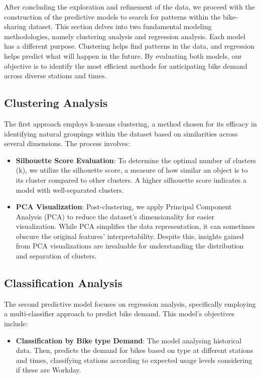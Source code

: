 After concluding the exploration and refinement of the data, we proceed with the construction of the predictive models to search for patterns within the bike-sharing dataset.
This section delves into two fundamental modeling methodologies, namely clustering analysis and regression analysis.
Each model has a different purpose.
Clustering helps find patterns in the data, and regression helps predict what will happen in the future.
By evaluating both models, our objective is to identify the most efficient methods for anticipating bike demand across diverse stations and times.

\subsection{Clustering Analysis}\label{subsec:clustering-analysis}


The first approach employs k-means clustering, a method chosen for its efficacy in identifying natural groupings within the dataset based on similarities across several dimensions.
The process involves:

\begin{itemize}
    \item \textbf{Silhouette Score Evaluation}: To determine the optimal number of clusters (k), we utilize the silhouette score, a measure of how similar an object is to its cluster compared to other clusters.
    A higher silhouette score indicates a model with well-separated clusters.
    \item \textbf{PCA Visualization}: Post-clustering, we apply Principal Component Analysis (PCA) to reduce the dataset's dimensionality for easier visualization.
    While PCA simplifies the data representation, it can sometimes obscure the original features' interpretability.
    Despite this, insights gained from PCA visualizations are invaluable for understanding the distribution and separation of clusters.
\end{itemize}

\subsection{Classification Analysis}\label{subsec:classification-analysis}
    The second predictive model focuses on regression analysis, specifically employing a multi-classifier approach to predict bike demand.
    This model's objectives include:
\begin{itemize}
    \item \textbf{Classification by Bike type Demand}: The model analysing historical data.
    Then, predicts the demand for bikes based on type at different stations and times, classifying stations according to expected usage levels considering if these are Workday.
\end{itemize}

